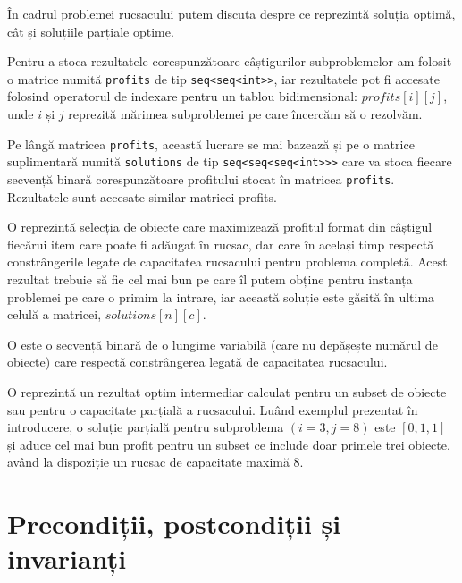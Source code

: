 \begin{sloppypar}
În cadrul problemei rucsacului putem discuta despre ce reprezintă soluția optimă, cât și soluțiile parțiale optime. \par
Pentru a stoca rezultatele corespunzătoare câștigurilor subproblemelor am folosit o matrice numită \texttt{profits} de tip \texttt{seq<seq<int>>}, iar rezultatele pot fi accesate folosind operatorul de indexare pentru un tablou bidimensional: $profits[i][j]$, unde $i$ și $j$ reprezită mărimea subproblemei pe care încercăm să o rezolvăm.
\par
Pe lângă matricea \texttt{profits}, această lucrare se mai bazează și pe o matrice suplimentară numită \texttt{solutions} de tip \texttt{seq<seq<seq<int>>>} care va stoca fiecare secvență binară corespunzătoare profitului stocat în matricea \texttt{profits}. Rezultatele sunt accesate similar matricei profits.
\par
O  reprezintă selecția de obiecte care maximizează profitul format din câștigul fiecărui item care poate fi adăugat în rucsac, dar care în același timp respectă constrângerile legate de capacitatea rucsacului pentru problema completă. Acest rezultat trebuie să fie cel mai bun pe care îl putem obține pentru instanța problemei pe care o primim la intrare, iar această soluție este găsită în ultima celulă a matricei, $solutions[n][c]$.
\par
O  este o secvență binară de o lungime variabilă (care nu depășește numărul de obiecte) care respectă constrângerea legată de capacitatea rucsacului. \par
O  reprezintă un rezultat optim intermediar calculat pentru un subset de obiecte sau pentru o capacitate parțială a rucsacului. Luând exemplul prezentat în introducere, o soluție parțială pentru subproblema $(i = 3, j = 8)$ este $[0, 1, 1]$ și aduce cel mai bun profit pentru un subset ce include doar primele trei obiecte, având la dispoziție un rucsac de capacitate maximă 8.

\section{Precondiții, postcondiții și invarianți}


\end{sloppypar}
